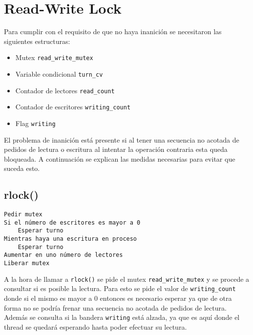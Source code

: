 \documentclass[a4paper]{article}
\begin{document}

\maketitle
\thispagestyle{empty}

\newpage
\tableofcontents

\newpage
\section{Read-Write Lock}
Para cumplir con el requisito de que no haya inanición se necesitaron las
siguientes estructuras:

\begin{itemize}
    \item{Mutex \texttt{read\_write\_mutex}}
    \item{Variable condicional \texttt{turn\_cv}}
    \item{Contador de lectores \texttt{read\_count}}
    \item{Contador de escritores \texttt{writing\_count}}
    \item{Flag \texttt{writing}}
\end{itemize}

El problema de inanición está presente si al tener una secuencia no acotada
de pedidos de lectura o escritura al intentar la operación contraria esta queda
bloqueada. A continuación se explican las medidas necesarias para evitar que
suceda esto.

\subsection*{rlock()}
\begin{codesnippet}
\begin{verbatim}
Pedir mutex
Si el número de escritores es mayor a 0
    Esperar turno
Mientras haya una escritura en proceso
    Esperar turno
Aumentar en uno número de lectores
Liberar mutex
\end{verbatim}
\end{codesnippet}

A la hora de llamar a \texttt{rlock()} se pide el mutex
\texttt{read\_write\_mutex} y se procede a consultar si es posible la lectura.
Para esto se pide el valor de \texttt{writing\_count} donde si el mismo es mayor
a 0 entonces es necesario esperar ya que de otra forma no se podría frenar una
secuencia no acotada de pedidos de lectura. Además se consulta si la bandera
\texttt{writing} está alzada, ya que es aquí donde el thread se quedará
esperando hasta poder efectuar su lectura.
\end{document}
